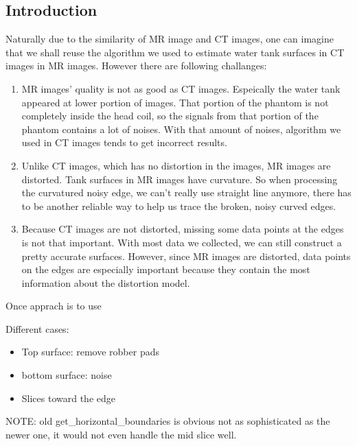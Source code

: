 
\subsection{Introduction}
Naturally due to the similarity of MR image and CT images, one can imagine that we shall reuse the algorithm
we used to estimate water tank surfaces in CT images in MR images. However there are following challanges:
\begin{enumerate}
  \item MR images' quality is not as good as CT images. Espeically the water tank appeared at lower portion
    of images. That portion of the phantom is not completely inside the head coil, so the signals from that
    portion of the phantom contains a lot of noises. With that amount of noises, algorithm we used in CT 
    images tends to get incorrect results. %
  \item Unlike CT images, which has no distortion in the images, MR images are distorted. Tank surfaces
    in MR images have curvature. So when processing the curvatured noisy edge, we can't really use straight
    line anymore, there has to be another reliable way to help us trace the broken, noisy curved edges.
  \item Because CT images are not distorted, missing some data points at the edges is not that important.
    With most data we collected, we can still construct a pretty accurate surfaces. However, since MR images
    are distorted, data points on the edges are especially important because they contain the most information
    about the distortion model.
\end{enumerate}

Once apprach is to use 

Different cases:
\begin{itemize}
\item Top surface: remove robber pads
\item bottom surface: noise
\item Slices toward the edge %
\end{itemize}

NOTE: old get_horizontal_boundaries is obvious not as sophisticated as the newer one, it would not even handle
the mid slice well.

